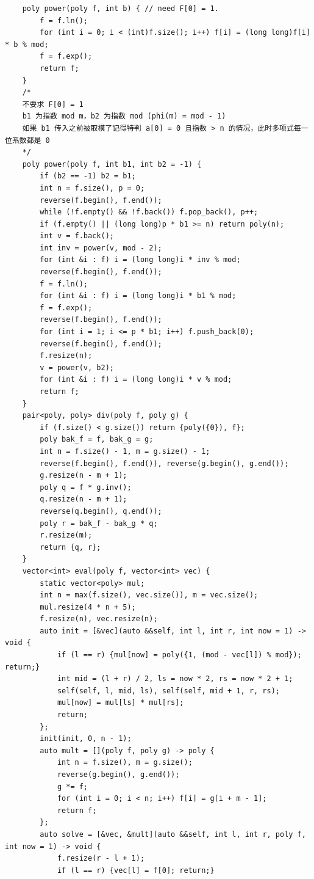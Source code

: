 \begin{verbatim}
    poly power(poly f, int b) { // need F[0] = 1.
        f = f.ln();
        for (int i = 0; i < (int)f.size(); i++) f[i] = (long long)f[i] * b % mod;
        f = f.exp();
        return f;
    }
    /*
    不要求 F[0] = 1
    b1 为指数 mod m，b2 为指数 mod (phi(m) = mod - 1)
    如果 b1 传入之前被取模了记得特判 a[0] = 0 且指数 > n 的情况，此时多项式每一位系数都是 0
    */
    poly power(poly f, int b1, int b2 = -1) {
        if (b2 == -1) b2 = b1;
        int n = f.size(), p = 0;
        reverse(f.begin(), f.end());
        while (!f.empty() && !f.back()) f.pop_back(), p++;
        if (f.empty() || (long long)p * b1 >= n) return poly(n);
        int v = f.back();
        int inv = power(v, mod - 2);
        for (int &i : f) i = (long long)i * inv % mod;
        reverse(f.begin(), f.end());
        f = f.ln();
        for (int &i : f) i = (long long)i * b1 % mod;
        f = f.exp();
        reverse(f.begin(), f.end());
        for (int i = 1; i <= p * b1; i++) f.push_back(0);
        reverse(f.begin(), f.end());
        f.resize(n);
        v = power(v, b2);
        for (int &i : f) i = (long long)i * v % mod;
        return f;
    }
    pair<poly, poly> div(poly f, poly g) {
        if (f.size() < g.size()) return {poly({0}), f};
        poly bak_f = f, bak_g = g;
        int n = f.size() - 1, m = g.size() - 1;
        reverse(f.begin(), f.end()), reverse(g.begin(), g.end());
        g.resize(n - m + 1);
        poly q = f * g.inv();
        q.resize(n - m + 1);
        reverse(q.begin(), q.end());
        poly r = bak_f - bak_g * q;
        r.resize(m);
        return {q, r};
    }
    vector<int> eval(poly f, vector<int> vec) {
        static vector<poly> mul;
        int n = max(f.size(), vec.size()), m = vec.size();
        mul.resize(4 * n + 5);
        f.resize(n), vec.resize(n);
        auto init = [&vec](auto &&self, int l, int r, int now = 1) -> void {
            if (l == r) {mul[now] = poly({1, (mod - vec[l]) % mod}); return;}
            int mid = (l + r) / 2, ls = now * 2, rs = now * 2 + 1;
            self(self, l, mid, ls), self(self, mid + 1, r, rs);
            mul[now] = mul[ls] * mul[rs];
            return;
        };
        init(init, 0, n - 1);
        auto mult = [](poly f, poly g) -> poly {
            int n = f.size(), m = g.size();
            reverse(g.begin(), g.end());
            g *= f;
            for (int i = 0; i < n; i++) f[i] = g[i + m - 1];
            return f;
        };
        auto solve = [&vec, &mult](auto &&self, int l, int r, poly f, int now = 1) -> void {
            f.resize(r - l + 1);
            if (l == r) {vec[l] = f[0]; return;}

\end{verbatim}

